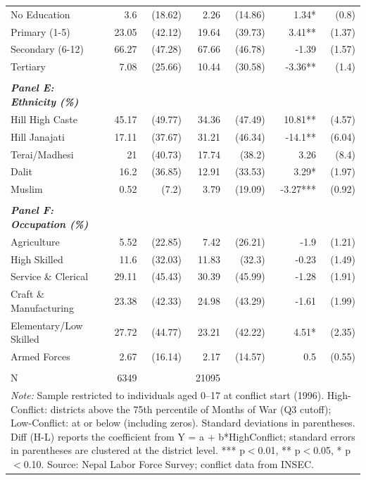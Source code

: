 \begin{landscape}
\begin{table}[!h]
{\begin{tabular}[t]{lrrrrrr}
No Education & 3.6 & (18.62) & 2.26 & (14.86) & 1.34* & (0.8)\\
Primary (1-5) & 23.05 & (42.12) & 19.64 & (39.73) & 3.41** & (1.37)\\
\addlinespace
Secondary (6-12) & 66.27 & (47.28) & 67.66 & (46.78) & -1.39 & (1.57)\\
Tertiary & 7.08 & (25.66) & 10.44 & (30.58) & -3.36** & (1.4)\\
 &  &  &  &  &  & \\
\em{\textbf{Panel E: Ethnicity (\%)}} & \em{\textbf{}} & \em{\textbf{}} & \em{\textbf{}} & \em{\textbf{}} & \em{\textbf{}} & \em{\textbf{}}\\
Hill High Caste & 45.17 & (49.77) & 34.36 & (47.49) & 10.81** & (4.57)\\
\addlinespace
Hill Janajati & 17.11 & (37.67) & 31.21 & (46.34) & -14.1** & (6.04)\\
Terai/Madhesi & 21 & (40.73) & 17.74 & (38.2) & 3.26 & (8.4)\\
Dalit & 16.2 & (36.85) & 12.91 & (33.53) & 3.29* & (1.97)\\
Muslim & 0.52 & (7.2) & 3.79 & (19.09) & -3.27*** & (0.92)\\
 &  &  &  &  &  & \\
\addlinespace
\em{\textbf{Panel F: Occupation (\%)}} & \em{\textbf{}} & \em{\textbf{}} & \em{\textbf{}} & \em{\textbf{}} & \em{\textbf{}} & \em{\textbf{}}\\
Agriculture & 5.52 & (22.85) & 7.42 & (26.21) & -1.9 & (1.21)\\
High Skilled & 11.6 & (32.03) & 11.83 & (32.3) & -0.23 & (1.49)\\
Service \& Clerical & 29.11 & (45.43) & 30.39 & (45.99) & -1.28 & (1.91)\\
Craft \& Manufacturing & 23.38 & (42.33) & 24.98 & (43.29) & -1.61 & (1.99)\\
\addlinespace
Elementary/Low Skilled & 27.72 & (44.77) & 23.21 & (42.22) & 4.51* & (2.35)\\
Armed Forces & 2.67 & (16.14) & 2.17 & (14.57) & 0.5 & (0.55)\\
 &  &  &  &  &  & \\
N & 6349 &  & 21095 &  &  & \\
\bottomrule
\multicolumn{7}{l}{\rule{0pt}{1em}\textit{Note: } Sample restricted to individuals aged 0--17 at conflict start (1996). High-Conflict: districts above the 75th percentile of Months of War (Q3 cutoff); Low-Conflict: at or below (including zeros). Standard deviations in parentheses. Diff (H-L) reports the coefficient from Y = a + b*HighConflict; standard errors in parentheses are clustered at the district level. *** p$<$0.01, ** p$<$0.05, * p$<$0.10. Source: Nepal Labor Force Survey; conflict data from INSEC.}\\
\end{tabular}}
\end{table}
\end{landscape}
